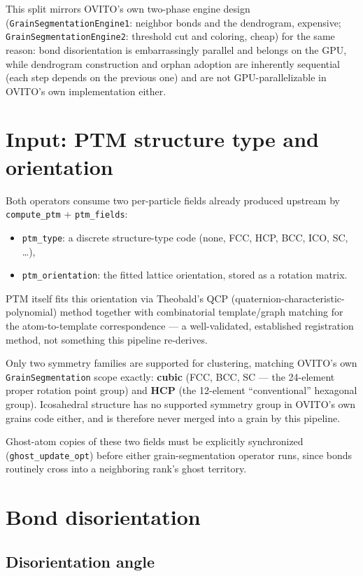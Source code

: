 \documentclass[11pt,a4paper]{article}
\newcommand{\op}[1]{\texttt{#1}}
\newcommand{\field}[1]{\texttt{#1}}
\newcommand{\code}[1]{\texttt{#1}}
\begin{document}
This split mirrors OVITO's own two-phase engine design (\code{GrainSegmentationEngine1}: neighbor
bonds and the dendrogram, expensive; \code{GrainSegmentationEngine2}: threshold cut and coloring,
cheap) for the same reason: bond disorientation is embarrassingly parallel and belongs on the GPU,
while dendrogram construction and orphan adoption are inherently sequential (each step depends on
the previous one) and are not GPU-parallelizable in OVITO's own implementation either.

\section{Input: PTM structure type and orientation}

Both operators consume two per-particle fields already produced upstream by \op{compute\_ptm} +
\op{ptm\_fields}:
\begin{itemize}[nosep]
  \item \field{ptm\_type}: a discrete structure-type code (none, FCC, HCP, BCC, ICO, SC, \ldots),
  \item \field{ptm\_orientation}: the fitted lattice orientation, stored as a rotation matrix.
\end{itemize}
PTM itself fits this orientation via Theobald's QCP (quaternion-characteristic-polynomial) method
together with combinatorial template/graph matching for the atom-to-template correspondence
\cite{ptm2016} — a well-validated, established registration method, not something this pipeline
re-derives.

Only two symmetry families are supported for clustering, matching OVITO's own
\code{GrainSegmentation} scope exactly: \textbf{cubic} (FCC, BCC, SC — the 24-element proper
rotation point group) and \textbf{HCP} (the 12-element ``conventional'' hexagonal group). Icosahedral
structure has no supported symmetry group in OVITO's own grains code either, and is therefore
never merged into a grain by this pipeline.

Ghost-atom copies of these two fields must be explicitly synchronized (\op{ghost\_update\_opt})
before either grain-segmentation operator runs, since bonds routinely cross into a neighboring
rank's ghost territory.

\section{Bond disorientation}
\label{sec:disorientation}

\subsection{Disorientation angle}
\end{document}
